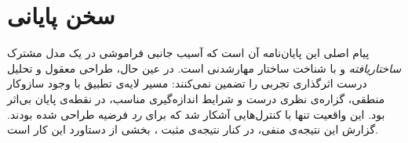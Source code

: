 \section{سخن پایانی}
\label{sec:concl-final}

پیام اصلی این پایان‌نامه آن است که آسیب جانبی فراموشی در یک مدل مشترک \emph{ساختاریافته} و با شناخت ساختار مهارشدنی است. در عین حال، طراحی معقول و تحلیل درست اثرگذاری تجربی را تضمین نمی‌کنند: مسیر لایه‌ی تطبیق با وجود سازوکار منطقی، گزاره‌ی نظری درست و شرایط اندازه‌گیری مناسب، در نقطه‌ی پایان بی‌اثر بود. این واقعیت تنها با کنترل‌هایی آشکار شد که برای \emph{رد} فرضیه طراحی شده بودند. گزارش این نتیجه‌ی منفی، در کنار نتیجه‌ی مثبت ، بخشی از دستاورد این کار است.
